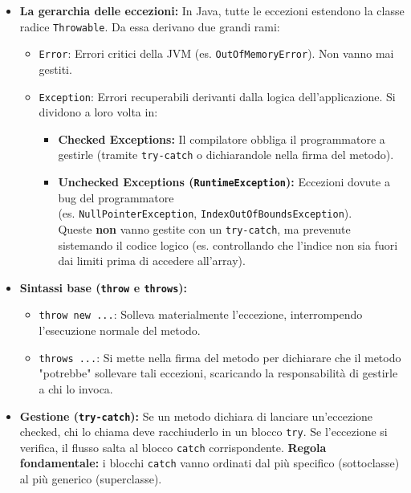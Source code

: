 \documentclass[12pt, a4paper]{article}
\begin{document}
\begin{itemize}
    \item \textbf{La gerarchia delle eccezioni:} In Java, tutte le eccezioni estendono la classe radice \texttt{Throwable}. Da essa derivano due grandi rami:
    \begin{itemize}
        \item \texttt{Error}: Errori critici della JVM (es. \texttt{OutOfMemoryError}). Non vanno mai gestiti.
        \item \texttt{Exception}: Errori recuperabili derivanti dalla logica dell'applicazione. Si dividono a loro volta in:
        \begin{itemize}
            \item \textbf{Checked Exceptions:} Il compilatore obbliga il programmatore a gestirle (tramite \texttt{try-catch} o dichiarandole nella firma del metodo).
            \item \textbf{Unchecked Exceptions (\texttt{RuntimeException}):} Eccezioni dovute a bug del programmatore \\ (es. \texttt{NullPointerException}, \texttt{IndexOutOfBoundsException}). \\ Queste \textbf{non} vanno gestite con un \texttt{try-catch}, ma prevenute sistemando il codice logico (es. controllando che l'indice non sia fuori dai limiti prima di accedere all'array).
        \end{itemize}
    \end{itemize}
    
\newpage

    \item \textbf{Sintassi base (\texttt{throw} e \texttt{throws}):}
    \begin{itemize}
        \item \texttt{throw new ...}: Solleva materialmente l'eccezione, interrompendo l'esecuzione normale del metodo.
        \item \texttt{throws ...}: Si mette nella firma del metodo per dichiarare che il metodo "potrebbe" sollevare tali eccezioni, scaricando la responsabilità di gestirle a chi lo invoca.
    \end{itemize}

    \item \textbf{Gestione (\texttt{try-catch}):} Se un metodo dichiara di lanciare un'eccezione checked, chi lo chiama deve racchiuderlo in un blocco \texttt{try}. Se l'eccezione si verifica, il flusso salta al blocco \texttt{catch} corrispondente. \textbf{Regola fondamentale:} i blocchi \texttt{catch} vanno ordinati dal più specifico (sottoclasse) al più generico (superclasse).


\end{itemize}
\end{document}
